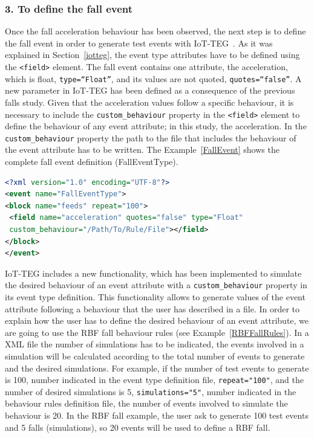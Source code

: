 \documentclass[review]{elsarticle}
\begin{document}
\subsubsection*{3. To define the fall event} Once the fall acceleration behaviour has been observed, the next step is to define the 
fall event in order to generate test events with IoT-TEG~\cite{TesisGutierrez2017,Gutierrez2017}. As it was explained in 
Section~\ref{iotteg}, the event type attributes have
to be defined using the \texttt{<field>} element. The fall event contains one attribute, the acceleration, which is float, 
\texttt{type=``Float''}, and its values are not quoted, \texttt{quotes=``false''}. A new parameter in IoT-TEG has been defined as a 
consequence of the previous falls study. Given that the acceleration values follow a specific behaviour, it is necessary to include 
the \texttt{custom\_behaviour} property in the \texttt{<field>} element to define the behaviour of any event attribute; 
in this study, the acceleration. In the \texttt{custom\_behaviour} property the path to the file that includes the behaviour of the 
event attribute has to be written. The Example~\ref{FallEvent} shows the complete fall event definition (FallEventType).

\begin{lstlisting}[basicstyle=\ttfamily\footnotesize,language=XML,caption={Fall event type definition},label=FallEvent]
<?xml version="1.0" encoding="UTF-8"?>
<event name="FallEventType">
<block name="feeds" repeat="100">
 <field name="acceleration" quotes="false" type="Float" 
 custom_behaviour="/Path/To/Rule/File"></field>
</block>
</event>
\end{lstlisting}

IoT-TEG includes a new functionality, which has been implemented to simulate the desired behaviour of an 
event attribute with a \texttt{custom\_behaviour} property in its event type definition. This functionality 
allows to generate values of the event attribute following a behaviour that the user has described in a file.
In order to explain how the user has to define the desired behaviour of an event attribute, we are going
to use the RBF fall behaviour rules (see Example~\ref{RBFFallRules}). In a XML file the number of simulations has to be
indicated, the events involved in a simulation will be calculated according to the total number of events
to generate and the desired simulations. For example, if the number of test events to generate is 100, 
number indicated in the event type definition file, \texttt{repeat="100"}, and the number of desired 
simulations is 5, \texttt{simulations="5"}, number indicated in the behaviour rules definition file, 
the number of events involved to simulate the behaviour is 20. In the RBF fall example, the user ask to 
generate 100 test events and 5 falls (simulations), so 20 events will be used to define a RBF fall.
\end{document}
